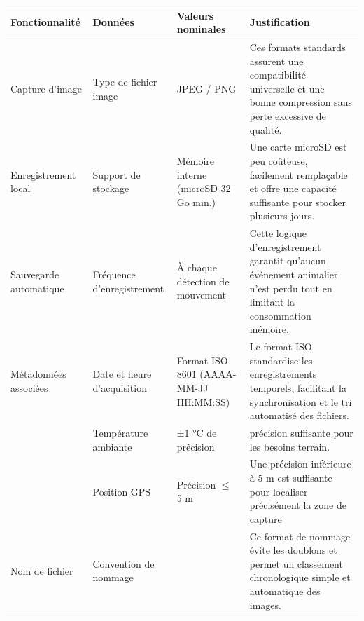 \begin{table}[ht]
   \centering
   \renewcommand{\arraystretch}{1} %
   \begin{tabularx}{\textwidth}{|p{3.2cm}|p{2.3cm}|p{3.5cm}|X|}
      \hline
      \textbf{Fonctionnalité} & \textbf{Données}             & \textbf{Valeurs nominales}                                           & \textbf{Justification}                                                                                                     \\
      \hline
      Capture d'image         & Type de fichier image        & JPEG / PNG                                                           & Ces formats standards assurent une compatibilité universelle et une bonne compression sans perte excessive de qualité.     \\
      \hline
      Enregistrement local    & Support de stockage          & Mémoire interne (microSD 32 Go min.)                                 & Une carte microSD est peu coûteuse, facilement remplaçable et offre une capacité suffisante pour stocker plusieurs jours.  \\
      \hline
      Sauvegarde automatique  & Fréquence d'enregistrement   & À chaque détection de mouvement                                      & Cette logique d'enregistrement garantit qu'aucun événement animalier n'est perdu tout en limitant la consommation mémoire. \\
      \hline
      Métadonnées associées   & Date et heure d'acquisition  & Format ISO 8601 (AAAA-MM-JJ HH:MM:SS)                                & Le format ISO standardise les enregistrements temporels, facilitant la synchronisation et le tri automatisé des fichiers.  \\
      \hline
                              & Température ambiante         & ±1 °C de précision                                                   & précision suffisante pour les besoins terrain.                                                                             \\
      \hline
                              & Position GPS                 & Précision $\leq$ 5 m                                                 & Une précision inférieure à 5 m est suffisante pour localiser précisément la zone de capture                                \\
      \hline
      Nom de fichier          & Convention de nommage        &                                                                      & Ce format de nommage évite les doublons et permet un classement chronologique simple et automatique des images.            \\

\end{tabularx}
\end{table}
